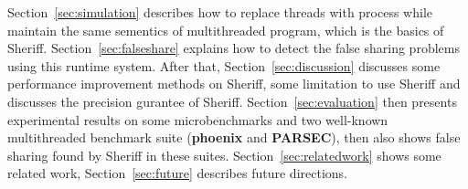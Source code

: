 Section~\ref{sec:simulation} describes how to replace threads with process 
while maintain the same sementics of multithreaded program, which is the basics of Sheriff.
Section~\ref{sec:falseshare} explains how to detect the false sharing problems using this runtime system. 
After that, Section~\ref{sec:discussion} discusses some performance improvement methods on Sheriff, 
some limitation to use Sheriff and discusses the precision gurantee of Sheriff.
Section~\ref{sec:evaluation} then presents experimental results on some microbenchmarks 
and two well-known multithreaded benchmark suite (\textbf{phoenix} and \textbf{PARSEC}), 
then also shows false sharing found by Sheriff in these suites.
Section~\ref{sec:relatedwork} shows some related work, Section~\ref{sec:future} describes future directions. 
